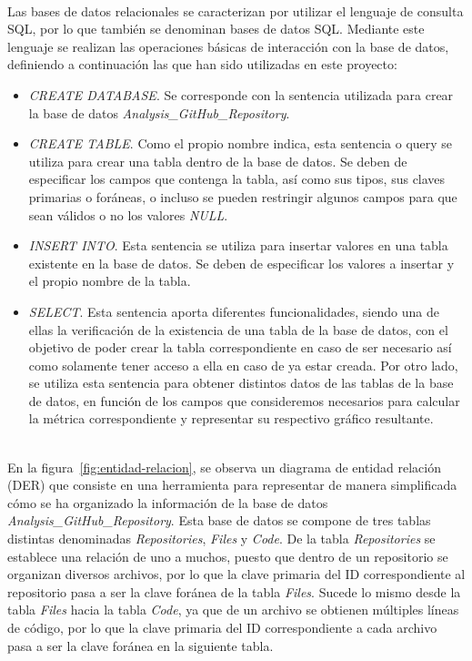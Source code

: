 \documentclass[a4paper, 12pt]{book}
\begin{document}
\\Las bases de datos relacionales se caracterizan por utilizar el lenguaje de consulta SQL, por lo que también se denominan bases de datos SQL. Mediante este lenguaje se realizan las operaciones básicas de interacción con la base de datos, definiendo a continuación las que han sido
utilizadas en este proyecto:
\begin{itemize}
  \item \textit{CREATE DATABASE}. Se corresponde con la sentencia utilizada para crear la base de datos \textit{Analysis\_GitHub\_Repository}.
  \item \textit{CREATE TABLE}. Como el propio nombre indica, esta sentencia o query se utiliza para crear una tabla dentro de la base de datos. Se deben de especificar los campos que contenga la tabla, así como sus tipos, sus claves primarias o foráneas, o incluso se pueden restringir
  algunos campos para que sean válidos o no los valores \textit{NULL}.
  \item \textit{INSERT INTO}. Esta sentencia se utiliza para insertar valores en una tabla existente en la base de datos. Se deben de especificar los valores a insertar y el propio nombre de la tabla.
  \item \textit{SELECT}. Esta sentencia aporta diferentes funcionalidades, siendo una de ellas la verificación de la existencia de una tabla de la base de datos, con el objetivo de poder crear la tabla correspondiente en caso de ser necesario así como solamente tener acceso a ella
  en caso de ya estar creada. Por otro lado, se utiliza esta sentencia para obtener distintos datos de las tablas de la base de datos, en función de los campos que consideremos necesarios para calcular la métrica correspondiente y representar su respectivo gráfico resultante.
\end{itemize}

\\En la figura~\ref{fig:entidad-relacion}, se observa un diagrama de entidad relación (DER) que consiste en una herramienta para representar de manera simplificada cómo se ha organizado la información de la base de datos \textit{Analysis\_GitHub\_Repository}. Esta base de datos se compone de tres tablas
distintas denominadas \textit{Repositories}, \textit{Files} y \textit{Code}. De la tabla \textit{Repositories} se establece una relación de uno a muchos, puesto que dentro de un repositorio se organizan diversos archivos, por lo que la clave primaria del ID correspondiente
al repositorio pasa a ser la clave foránea de la tabla \textit{Files}. Sucede lo mismo desde la tabla \textit{Files} hacia la tabla \textit{Code}, ya que de un archivo se obtienen múltiples líneas de código, por lo que la clave primaria del ID correspondiente a cada archivo
pasa a ser la clave foránea en la siguiente tabla.
\end{document}

